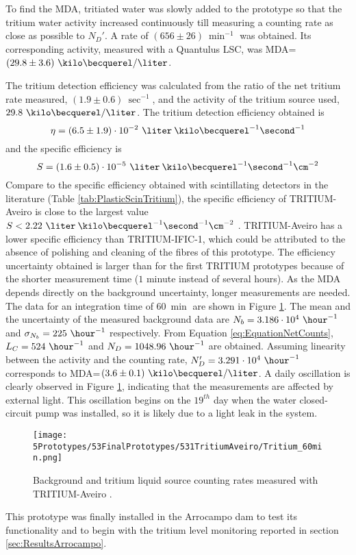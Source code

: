To find the MDA, tritiated water was slowly added to the prototype so that the tritium water activity increased continuously till measuring a counting rate as close as possible to $N_D'$. A rate of $(656 \pm 26)~\min^{-1}$ was obtained. Its corresponding activity, measured with a Quantulus LSC, was MDA=$(29.8\pm 3.6)~\kilo\becquerel/\liter$.

The tritium detection efficiency was calculated from the ratio of the net tritium rate measured, $(1.9 \pm 0.6)~\sec^{-1}$, and the activity of the tritium source used, $29.8~\kilo\becquerel/\liter$. The tritium detection efficiency obtained is $$\eta=(6.5 \pm 1.9)\cdot{} 10^{-2}~\liter\:\kilo\becquerel^{-1}\second^{-1}$$ and the specific efficiency is
$$S=(1.6 \pm 0.5)\cdot{} 10^{-5}~\liter\:\kilo\becquerel^{-1}\second^{-1}\cm^{-2}$$ 
Compare to the specific efficiency obtained with scintillating detectors in the literature (Table \ref{tab:PlasticScinTritium}), the specific efficiency of TRITIUM-Aveiro is close to the largest value $S<2.22~\liter\:\kilo\becquerel^{-1}\second^{-1}\cm^{-2}$ \cite{Hofstetter1, Hofstetter2}. TRITIUM-Aveiro has a lower specific efficiency than TRITIUM-IFIC-1, which could be attributed to the absence of polishing and cleaning of the fibres of this prototype. The efficiency uncertainty obtained is larger than for the first TRITIUM prototypes because of the shorter measurement time ($1$ minute instead of several hours). As the MDA depends directly on the background uncertainty, longer measurements are needed. The data for an integration time of $60~\min$ are shown in Figure \ref{fig:Tritium60min}. The mean and the uncertainty of the measured background data are $N_b = 3.186 \cdot{} 10^{4}~\hour^{-1}$ and $\sigma_{N_b} = 225~\hour^{-1}$ respectively. From Equation \ref{eq:EquationNetCounts}, $L_C=524~\hour^{-1}$ and $N_D=1048.96~\hour^{-1}$ are obtained. Assuming linearity between the activity and the counting rate, $N_D'=3.291\cdot{}10^4~\hour^{-1}$ corresponds to MDA=$(3.6 \pm 0.1)~\kilo\becquerel/\liter$. A daily oscillation is clearly observed in Figure \ref{fig:Tritium60min}, indicating that the measurements are affected by external light. This oscillation begins on the $19^{th}$ day when the water closed-circuit pump was installed, so it is likely due to a light leak in the system.
\begin{figure}[h]
\centering
\texttt{[image: 5Prototypes/53FinalPrototypes/531TritiumAveiro/Tritium\_60min.png]}
\caption{Background and tritium liquid source counting rates measured with TRITIUM-Aveiro \cite{ExperimentalPaperCarlos}. \label{fig:Tritium60min}}
\end{figure}
This prototype was finally installed in the Arrocampo dam to test its functionality and to begin with the tritium level monitoring reported in section \ref{sec:ResultsArrocampo}.